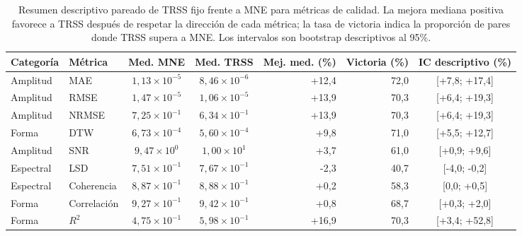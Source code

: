 \begin{table}[htbp]
\centering
\scriptsize
\setlength{\tabcolsep}{3.0pt}
\caption{Resumen descriptivo pareado de TRSS fijo frente a MNE para métricas de calidad. La mejora mediana positiva favorece a TRSS después de respetar la dirección de cada métrica; la tasa de victoria indica la proporción de pares donde TRSS supera a MNE. Los intervalos son bootstrap descriptivos al 95\%.}
\label{tab:ch4_descriptive_trss_mne}
\begin{tabular}{@{}llccrrc@{}}
\toprule
Categoría & Métrica & Med. MNE & Med. TRSS & Mej. med. (\%) & Victoria (\%) & IC descriptivo (\%) \\
\midrule
Amplitud & MAE & $1{,}13\times10^{-5}$ & $8{,}46\times10^{-6}$ & +12{,}4 & 72{,}0 & [+7{,}8; +17{,}4] \\
Amplitud & RMSE & $1{,}47\times10^{-5}$ & $1{,}06\times10^{-5}$ & +13{,}9 & 70{,}3 & [+6{,}4; +19{,}3] \\
Amplitud & NRMSE & $7{,}25\times10^{-1}$ & $6{,}34\times10^{-1}$ & +13{,}9 & 70{,}3 & [+6{,}4; +19{,}3] \\
Forma & DTW & $6{,}73\times10^{-4}$ & $5{,}60\times10^{-4}$ & +9{,}8 & 71{,}0 & [+5{,}5; +12{,}7] \\
Amplitud & SNR & $9{,}47\times10^{0}$ & $1{,}00\times10^{1}$ & +3{,}7 & 61{,}0 & [+0{,}9; +9{,}6] \\
Espectral & LSD & $7{,}51\times10^{-1}$ & $7{,}67\times10^{-1}$ & -2{,}3 & 40{,}7 & [-4{,}0; -0{,}2] \\
Espectral & Coherencia & $8{,}87\times10^{-1}$ & $8{,}88\times10^{-1}$ & +0{,}2 & 58{,}3 & [0{,}0; +0{,}5] \\
Forma & Correlación & $9{,}27\times10^{-1}$ & $9{,}42\times10^{-1}$ & +0{,}8 & 68{,}7 & [+0{,}3; +2{,}0] \\
Forma & $R^2$ & $4{,}75\times10^{-1}$ & $5{,}98\times10^{-1}$ & +16{,}9 & 70{,}3 & [+3{,}4; +52{,}8] \\
\bottomrule
\end{tabular}
\end{table}

